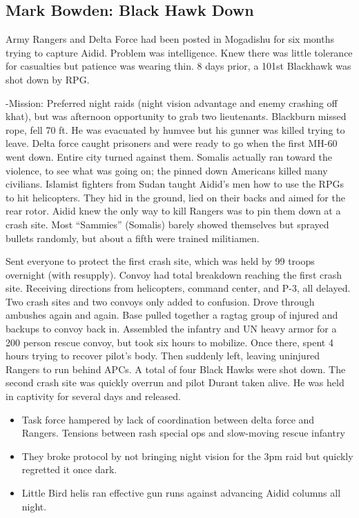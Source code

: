 \documentclass[
]{article}
\begin{document}
\hypertarget{mark-bowden-black-hawk-down}{%
\subsection{Mark Bowden: Black Hawk
Down}\label{mark-bowden-black-hawk-down}}

Army Rangers and Delta Force had been posted in Mogadishu for six months
trying to capture Aidid. Problem was intelligence. Knew there was little
tolerance for casualties but patience was wearing thin. 8 days prior, a
101st Blackhawk was shot down by RPG.

-Mission: Preferred night raids (night vision advantage and enemy
crashing off khat), but was afternoon opportunity to grab two
lieutenants. Blackburn missed rope, fell 70 ft. He was evacuated by
humvee but his gunner was killed trying to leave. Delta force caught
prisoners and were ready to go when the first MH-60 went down. Entire
city turned against them. Somalis actually ran toward the violence, to
see what was going on; the pinned down Americans killed many civilians.
Islamist fighters from Sudan taught Aidid's men how to use the RPGs to
hit helicopters. They hid in the ground, lied on their backs and aimed
for the rear rotor. Aidid knew the only way to kill Rangers was to pin
them down at a crash site. Most ``Sammies'' (Somalis) barely showed
themselves but sprayed bullets randomly, but about a fifth were trained
militiamen.

Sent everyone to protect the first crash site, which was held by 99
troops overnight (with resupply). Convoy had total breakdown reaching
the first crash site. Receiving directions from helicopters, command
center, and P-3, all delayed. Two crash sites and two convoys only added
to confusion. Drove through ambushes again and again. Base pulled
together a ragtag group of injured and backups to convoy back in.
Assembled the infantry and UN heavy armor for a 200 person rescue
convoy, but took six hours to mobilize. Once there, spent 4 hours trying
to recover pilot's body. Then suddenly left, leaving uninjured Rangers
to run behind APCs. A total of four Black Hawks were shot down. The
second crash site was quickly overrun and pilot Durant taken alive. He
was held in captivity for several days and released.

\begin{itemize}
\item
  Task force hampered by lack of coordination between delta force and
  Rangers. Tensions between rash special ops and slow-moving rescue
  infantry
\item
  They broke protocol by not bringing night vision for the 3pm raid but
  quickly regretted it once dark.
\item
  Little Bird helis ran effective gun runs against advancing Aidid
  columns all night.
\end{itemize}
\end{document}
